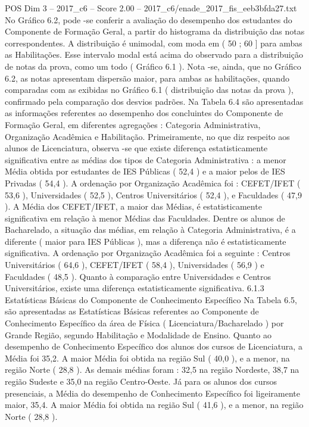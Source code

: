 \begin{textsample}{POS Dim 3 – 2017\_c6 – Score 2.00 – 2017\_c6/enade\_2017\_fis\_eeb3bfda27.txt}
No Gráfico 6.2, pode -se conferir a avaliação do desempenho dos estudantes do Componente de Formação Geral, a partir do histograma da distribuição das notas correspondentes.
A distribuição é unimodal, com moda em ( 50 ; 60 ] para ambas as Habilitações.
Esse intervalo modal está acima do observado para a distribuição de notas da prova, como um todo ( Gráfico 6.1 ).
Nota -se, ainda, que no Gráfico 6.2, as notas apresentam dispersão maior, para ambas as habilitações, quando comparadas com as exibidas no Gráfico 6.1 ( distribuição das notas da prova ), confirmado pela comparação dos desvios padrões.
Na Tabela 6.4 são apresentadas as informações referentes ao desempenho dos concluintes do Componente de Formação Geral, em diferentes agregações : Categoria Administrativa, Organização Acadêmica e Habilitação.
Primeiramente, no que diz respeito aos alunos de Licenciatura, observa -se que existe diferença estatisticamente significativa entre as médias dos tipos de Categoria Administrativa : a menor Média obtida por estudantes de IES Públicas ( 52,4 ) e a maior pelos de IES Privadas ( 54,4 ).
A ordenação por Organização Acadêmica foi : CEFET/IFET ( 53,6 ), Universidades ( 52,5 ), Centros Universitários ( 52,4 ), e Faculdades ( 47,9 ).
A Média dos CEFET/IFET, a maior das Médias, é estatisticamente significativa em relação à menor Médias das Faculdades.
Dentre os alunos de Bacharelado, a situação das médias, em relação à Categoria Administrativa, é a diferente ( maior para IES Públicas ), mas a diferença não é estatisticamente significativa.
A ordenação por Organização Acadêmica foi a seguinte : Centros Universitários ( 64,6 ), CEFET/IFET ( 58,4 ), Universidades ( 56,9 ) e Faculdades ( 48,5 ).
Quanto à comparação entre Universidades e Centros Universitários, existe uma diferença estatisticamente significativa. 6.1.3 Estatísticas Básicas do Componente de Conhecimento Específico Na Tabela 6.5, são apresentadas as Estatísticas Básicas referentes ao Componente de Conhecimento Específico da área de Física ( Licenciatura/Bacharelado ) por Grande Região, segundo Habilitação e Modalidade de Ensino.
Quanto ao desempenho de Conhecimento Específico dos alunos dos cursos de Licenciatura, a Média foi 35,2.
A maior Média foi obtida na região Sul ( 40,0 ), e a menor, na região Norte ( 28,8 ).
As demais médias foram : 32,5 na região Nordeste, 38,7 na região Sudeste e 35,0 na região Centro-Oeste.
Já para os alunos dos cursos presenciais, a Média do desempenho de Conhecimento Específico foi ligeiramente maior, 35,4.
A maior Média foi obtida na região Sul ( 41,6 ), e a menor, na região Norte ( 28,8 ).

\end{textsample}
